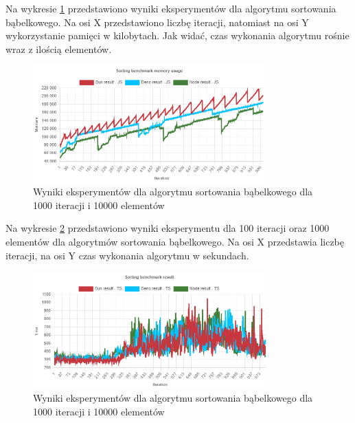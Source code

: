 Na wykresie \ref{fig:bubble_sorting_e6_memory_js} przedstawiono wyniki eksperymentów dla algorytmu sortowania bąbelkowego. Na osi X przedstawiono liczbę iteracji, natomiast na osi Y wykorzystanie pamięci w kilobytach. Jak widać, czas wykonania algorytmu rośnie wraz z ilością elementów.
\begin{figure}[H]
  \centering
  \includegraphics[width=0.8\textwidth]{Figures/sorting/bubble/e6_memory_js.png}
  \caption{Wyniki eksperymentów dla algorytmu sortowania bąbelkowego dla 1000 iteracji i 10000 elementów}
  \label{fig:bubble_sorting_e6_memory_js}
\end{figure}

Na wykresie \ref{fig:bubble_sorting_e6_ts} przedstawiono wyniki eksperymentu dla 100 iteracji oraz 1000 elementów dla algorytmów sortowania bąbelkowego. Na osi X przedstawia liczbę iteracji, na osi Y czas wykonania algorytmu w sekundach. 

\begin{figure}[H]
  \centering
  \includegraphics[width=0.8\textwidth]{Figures/sorting/bubble/e6_ts.png}
  \caption{Wyniki eksperymentów dla algorytmu sortowania bąbelkowego dla 1000 iteracji i 10000 elementów}
  \label{fig:bubble_sorting_e6_ts}
\end{figure}

